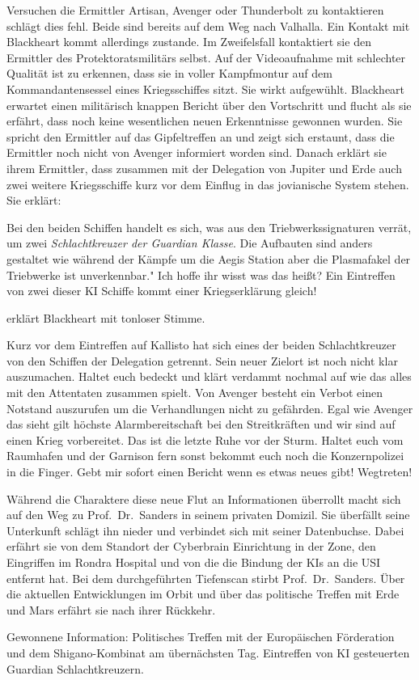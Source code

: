 Versuchen die Ermittler Artisan, Avenger oder Thunderbolt zu kontaktieren schlägt dies fehl. Beide sind bereits auf dem Weg nach Valhalla. Ein Kontakt mit Blackheart kommt allerdings zustande. Im Zweifelsfall kontaktiert sie den Ermittler des Protektoratsmilitärs selbst. Auf der Videoaufnahme mit schlechter Qualität ist zu erkennen, dass sie in voller Kampfmontur auf dem Kommandantensessel eines Kriegsschiffes sitzt. Sie wirkt aufgewühlt. Blackheart erwartet einen militärisch knappen Bericht über den Vortschritt und flucht als sie erfährt, dass noch keine wesentlichen neuen Erkenntnisse gewonnen wurden. Sie spricht den Ermittler auf das Gipfeltreffen an und zeigt sich erstaunt, dass die Ermittler noch nicht von Avenger informiert worden sind. Danach erklärt sie ihrem Ermittler, dass zusammen mit der Delegation von Jupiter und Erde auch zwei weitere Kriegsschiffe kurz vor dem Einflug in das jovianische System stehen. Sie erklärt:

\begin{speech}
	Bei den beiden Schiffen handelt es sich, was aus den Triebwerkssignaturen verrät, um zwei \emph{Schlachtkreuzer der Guardian Klasse}. Die Aufbauten sind anders gestaltet wie während der Kämpfe um die Aegis Station aber die Plasmafakel der Triebwerke ist unverkennbar." Ich hoffe ihr wisst was das heißt? Ein Eintreffen von zwei dieser KI Schiffe kommt einer Kriegserklärung gleich! 
\end{speech}

erklärt Blackheart mit tonloser Stimme. 

\begin{speech}
	Kurz vor dem Eintreffen auf Kallisto hat sich eines der beiden Schlachtkreuzer von den Schiffen der Delegation getrennt. Sein neuer Zielort ist noch nicht klar auszumachen. Haltet euch bedeckt und klärt verdammt nochmal auf wie das alles mit den Attentaten zusammen spielt. Von Avenger besteht ein Verbot einen Notstand auszurufen um die Verhandlungen nicht zu gefährden. Egal wie Avenger das sieht gilt höchste Alarmbereitschaft bei den Streitkräften und wir sind auf einen Krieg vorbereitet. Das ist die letzte Ruhe vor der Sturm. Haltet euch vom Raumhafen und der Garnison fern sonst bekommt euch noch die Konzernpolizei in die Finger. Gebt mir sofort einen Bericht wenn es etwas neues gibt! Wegtreten!
\end{speech}

Während die Charaktere diese neue Flut an Informationen überrollt macht sich \xl{} auf den Weg zu Prof.~Dr.~Sanders in seinem privaten Domizil. Sie überfällt seine Unterkunft schlägt ihn nieder und verbindet sich mit seiner Datenbuchse. Dabei erfährt sie von dem Standort der Cyberbrain Einrichtung in der Zone, den Eingriffen im Rondra Hospital und von \emph{} die die Bindung der KIs an die USI entfernt hat. Bei dem durchgeführten Tiefenscan stirbt Prof.~Dr.~Sanders. Über die aktuellen Entwicklungen im Orbit und über das politische Treffen mit Erde und Mars erfährt sie nach ihrer Rückkehr.

\begin{remarks}
	Gewonnene Information: Politisches Treffen mit der Europäischen Förderation und dem Shigano-Kombinat am übernächsten Tag. Eintreffen von KI gesteuerten Guardian Schlachtkreuzern.
\end{remarks}
